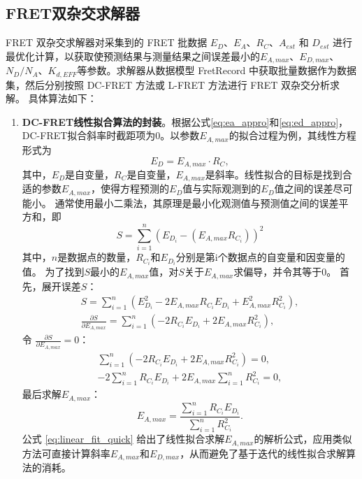 \subsection{FRET双杂交求解器}
FRET 双杂交求解器对采集到的 FRET 批数据 $E_D$、$E_A$、$R_C$、$A_{est}$ 和 $D_{est}$ 进行最优化计算，以获取使预测结果与测量结果之间误差最小的$E_{A,max}$、$E_{D,max}$、$N_D / N_A$、$K_{d,EFF}$等参数。求解器从数据模型 FretRecord 中获取批量数据作为数据集，然后分别按照 DC-FRET 方法或 L-FRET 方法进行 FRET 双杂交分析求解。
具体算法如下：
\begin{enumerate}
  \item \textbf{DC-FRET线性拟合算法的封装}。根据公式\ref{eq:ea_appro}和\ref{eq:ed_appro}，DC-FRET拟合斜率时截距项为0。以参数$E_{A,max}$的拟合过程为例，其线性方程形式为
  \begin{equation}
      E_D = E_{A,max}\cdot R_C,
  \end{equation}
  其中，$E_D$是自变量，$R_C$是自变量，$E_{A,max}$是斜率。线性拟合的目标是找到合适的参数$E_{A,max}$，使得方程预测的$E_D$值与实际观测到的$E_D$值之间的误差尽可能小。
  通常使用最小二乘法，其原理是最小化观测值与预测值之间的误差平方和，即
  \begin{equation}
      S=\sum^{n}_{i=1}(E_{D_i}-(E_{A,max}R_{C_i}))^2
  \end{equation}
  其中，$n$是数据点的数量，$R_{C_i}$和$E_{D_i}$分别是第i个数据点的自变量和因变量的值。
  为了找到$S$最小的$E_{A,max}$值，对$S$关于$E_{A,max}$求偏导，并令其等于0。
  首先，展开误差$S$：
  \begin{align}
       S=\sum_{i = 1}^{n}(E_{D_i}^{2}-2E_{A,max}R_{C_i}E_{D_i} + E_{A,max}^{2}R_{C_i}^{2}), \\
       \frac{\partial S}{\partial E_{A,max}}=\sum_{i = 1}^{n}(-2R_{C_i}E_{D_i} + 2E_{A,max}R_{C_i}^{2}),
  \end{align}
  令 \(\frac{\partial S}{\partial E_{A,max}}=0\)：
  \begin{align}
       \sum_{i = 1}^{n}(-2R_{C_i}E_{D_i} + 2E_{A,max}R_{C_i}^{2}) = 0, \\
      -2\sum_{i = 1}^{n}R_{C_i}E_{D_i}+2E_{A,max}\sum_{i = 1}^{n}R_{C_i}^{2}=0,
  \end{align}
  最后求解$E_{A,max}$：
  \begin{equation}
         E_{A,max}=\frac{\sum_{i = 1}^{n}R_{C_i}E_{D_i}}{\sum_{i = 1}^{n}R_{C_i}^{2}}. \label{eq:linear_fit_quick}
  \end{equation}
  公式 \ref{eq:linear_fit_quick} 给出了线性拟合求解$E_{A,max}$的解析公式，应用类似方法可直接计算斜率$E_{A,max}$和$E_{D,max}$，从而避免了基于迭代的线性拟合求解算法的消耗。


\end{enumerate}
